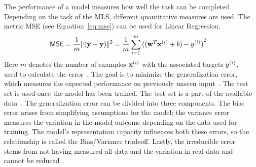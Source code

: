 The performance of a model measures how well the task can be completed.
Depending on the task of the \ac{MLS}, different quantitative measures are used.
The metric \ac{MSE} (see Equation~\ref{eq:mse}) can be used for Linear Regression.
\begin{equation}\label{eq:mse}
    \textsf{MSE} =\frac{1}{m}\lVert{(\hat{\textbf{y}} - \textbf{y})}\rVert^2
        =\frac{1}{m}\sum_{i=1}^m {((\textbf{w}^T \textbf{x}^{(i)} + b) - y^{(i)})}^2
\end{equation}
Here $m$ denotes the number of examples $\textbf{x}^{(i)}$ with the associated targets $y^{(i)}$, used to calculate
the error~\citep{geron_hands-machine_2017,goodfellow_deep_2016}.
The goal is to minimize the generalization error, which measures the expected performance on
previously unseen input~\citep{geron_hands-machine_2017}.
The test set is used once the model has been trained.
The test set is a part of the available data~\citep{geron_hands-machine_2017, goodfellow_deep_2016}.
The generalization error can be divided into three components.
The bias error arises from simplifying assumptions for the model; the variance error measures the
variation in the model outcome depending on the data used for training.
The model's representation capacity influences both these errors, so the
relationship is called the Bias/Variance tradeoff.
Lastly, the irreducible error stems from not having measured all data and the variation
in real data and cannot be
reduced~\citep{ashmore_assuring_2021, james_introduction_2013,geron_hands-machine_2017}.

